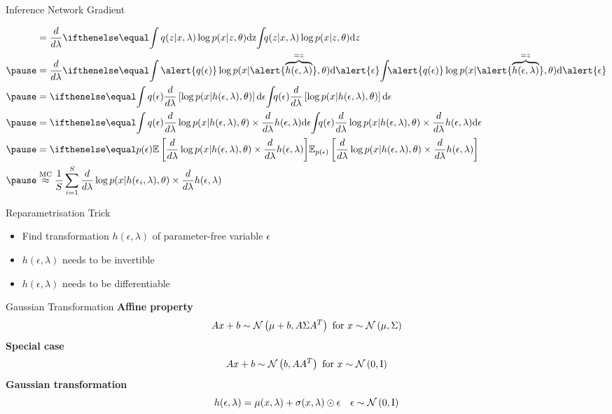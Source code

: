\documentclass[14pt]{beamer}
\begin{document}
\begin{frame}{Inference Network Gradient}
\begin{small}
\begin{equation*}
\begin{aligned}
&= \frac{d}{d\lambda} \intl{q(z|x,\lambda)\log p(x|z,\theta)}{z} \\ \pause
&= \frac{d}{d\lambda} \intl{\alert{q(\epsilon)} \log p(x | \alert{\overbrace{h(\epsilon, \lambda)}^{=z}},\theta)}{\alert{\epsilon}} \\ \pause
&= \intl{q(\epsilon) \frac{d}{d\lambda} \left[ \log p(x| h(\epsilon, \lambda), \theta)\right] }{\epsilon} \\ \pause
&= \intl{q(\epsilon) \frac{d}{d\lambda} \log p(x| h(\epsilon, \lambda), \theta) \times \frac{d}{d\lambda} h(\epsilon, \lambda)}{\epsilon}  \\ \pause
&= \E[p(\epsilon)]{\frac{d}{d\lambda} \log p(x| h(\epsilon, \lambda), \theta)\times \frac{d}{d\lambda} h(\epsilon, \lambda)}\\ \pause
&\overset{\text{MC}}{\approx} \frac{1}{S}\sum_{i=1}^{S} \frac{d}{d\lambda} \log p(x| h(\epsilon_{i}, \lambda), \theta) \times \frac{d}{d\lambda} h(\epsilon, \lambda)
\end{aligned}
\end{equation*}
\end{small}
\end{frame}

\begin{frame}{Reparametrisation Trick}
\begin{itemize}
\item Find transformation $ h(\epsilon, \lambda) $ of parameter-free variable $ \epsilon $
\item $ h(\epsilon, \lambda) $ needs to be invertible
\item $ h(\epsilon, \lambda) $ needs to be differentiable
\end{itemize}
\end{frame}

\begin{frame}{Gaussian Transformation}
\textbf{Affine property}
\begin{equation*}
Ax + b \sim \mathcal{N}\left(\mu + b,A\Sigma A^{T}\right) \text{ for } x \sim \mathcal{N}\left(\mu,\Sigma\right)
\end{equation*}
\pause
\textbf{Special case}
\begin{equation*}
Ax + b \sim \mathcal{N}\left(b,A A^{T}\right) \text{ for } x \sim \mathcal{N}\left(0,\operatorname{I}\right)
\end{equation*}
\pause
\textbf{Gaussian transformation}
\begin{equation*}
h(\epsilon, \lambda) = \mu(x,\lambda) + \sigma(x, \lambda)  \odot \epsilon~~~\epsilon \sim \mathcal{N}\left(0,\operatorname{I}\right)
\end{equation*}
\end{frame}
\end{document}
